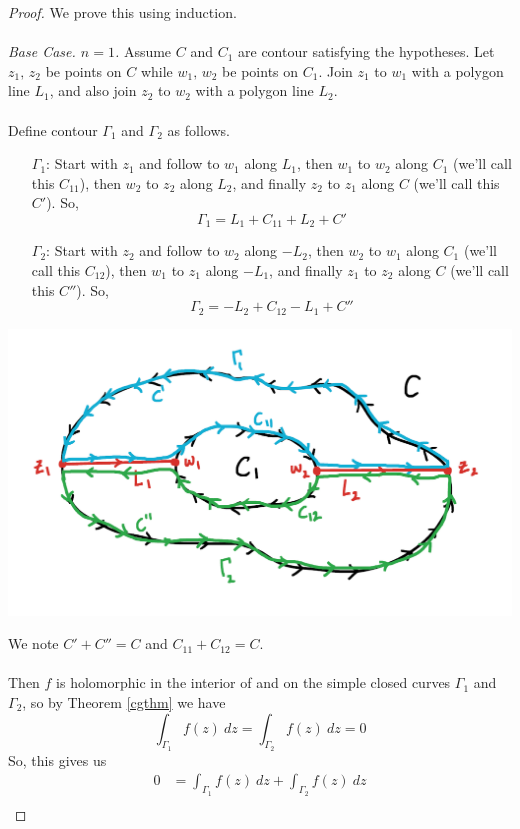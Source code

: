 \begin{proof}
We prove this using induction.\\
\\
\emph{Base Case. $n=1$.} Assume $C$ and $C_1$ are contour satisfying the hypotheses. Let $z_1,\,z_2$ be points on $C$ while $w_1,\,w_2$ be points on $C_1$. Join $z_1$ to $w_1$ with a polygon line $L_1$, and also join $z_2$ to $w_2$ with a polygon line $L_2$.\\
\\
Define contour $\Gamma_1$ and $\Gamma_2$ as follows.
\begin{itemize}
\item[$\Gamma_1$:] Start with $z_1$ and follow to $w_1$ along $L_1$, then $w_1$ to $w_2$ along $C_1$ (we'll call this $C_{11}$), then $w_2$ to $z_2$ along $L_2$, and finally $z_2$ to $z_1$ along $C$ (we'll call this $C'$). So, 
\[\Gamma_1 = L_1 + C_{11} + L_2 + C'\]
\item[$\Gamma_2$:] Start with $z_2$ and follow to $w_2$ along $-L_2$, then $w_2$ to $w_1$ along $C_1$ (we'll call this $C_{12}$), then $w_1$ to $z_1$ along $-L_1$, and finally $z_1$ to $z_2$ along $C$ (we'll call this $C''$). So, 
\[\Gamma_2 = -L_2 + C_{12} - L_1 + C''\]
\end{itemize}
\begin{center}
\includegraphics[scale=0.4]{Sections/Illustrations/CG-MCD-Base.png}
\end{center}
We note $C' + C'' = C$ and $C_{11} + C_{12} = C$.\\
\\
Then $f$ is holomorphic in the interior of and on the simple closed curves $\Gamma_1$ and $\Gamma_2$, so by Theorem \ref{cgthm} we have
\[\int_{\Gamma_1}f(z)\ dz = \int_{\Gamma_2}f(z)\ dz = 0\]
So, this gives us
\begin{align*}
0 &= \int_{\Gamma_1}f(z)\ dz + \int_{\Gamma_2}f(z)\ dz\\[1em]

\end{align*}
\end{proof}
